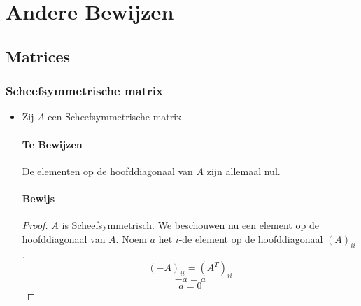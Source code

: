 \documentclass[lineaire_algebra_oplossingen.tex]{subfiles}
\begin{document}
\chapter{Andere Bewijzen}
\section{Matrices}

\subsection{Scheefsymmetrische matrix}
\begin{itemize}
\item
Zij $A$ een Scheefsymmetrische matrix.
\subsubsection*{Te Bewijzen}
De elementen op de hoofddiagonaal van $A$ zijn allemaal nul.

\subsubsection*{Bewijs}
\begin{proof}
$A$ is Scheefsymmetrisch. We beschouwen nu een element op de hoofddiagonaal van $A$. Noem $a$ het $i$-de element op de hoofddiagonaal $(A)_{ii}$.
\[
(-A)_{ii} = (A^T)_{ii}
\]
\[
-a = a
\]
\[
a = 0
\]
\end{proof}



\end{itemize}
\end{document}
